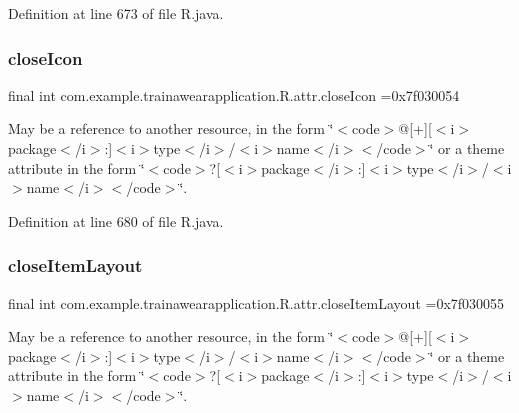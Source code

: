 Definition at line 673 of file R.\+java.

\mbox{\label{classcom_1_1example_1_1trainawearapplication_1_1_r_1_1attr_ac9d9c4e0778b08c2c91ad2f622e4270f}} 
\subsubsection{\texorpdfstring{closeIcon}{closeIcon}}
{\footnotesize\ttfamily final int com.\+example.\+trainawearapplication.\+R.\+attr.\+close\+Icon =0x7f030054\hspace{0.3cm}{\ttfamily [static]}}

May be a reference to another resource, in the form \char`\"{}$<$code$>$@\mbox{[}+\mbox{]}\mbox{[}$<$i$>$package$<$/i$>$\+:\mbox{]}$<$i$>$type$<$/i$>$/$<$i$>$name$<$/i$>$$<$/code$>$\char`\"{} or a theme attribute in the form \char`\"{}$<$code$>$?\mbox{[}$<$i$>$package$<$/i$>$\+:\mbox{]}$<$i$>$type$<$/i$>$/$<$i$>$name$<$/i$>$$<$/code$>$\char`\"{}. 

Definition at line 680 of file R.\+java.

\mbox{\label{classcom_1_1example_1_1trainawearapplication_1_1_r_1_1attr_aab0fe8f33c33e9568d975b0820208345}} 
\subsubsection{\texorpdfstring{closeItemLayout}{closeItemLayout}}
{\footnotesize\ttfamily final int com.\+example.\+trainawearapplication.\+R.\+attr.\+close\+Item\+Layout =0x7f030055\hspace{0.3cm}{\ttfamily [static]}}

May be a reference to another resource, in the form \char`\"{}$<$code$>$@\mbox{[}+\mbox{]}\mbox{[}$<$i$>$package$<$/i$>$\+:\mbox{]}$<$i$>$type$<$/i$>$/$<$i$>$name$<$/i$>$$<$/code$>$\char`\"{} or a theme attribute in the form \char`\"{}$<$code$>$?\mbox{[}$<$i$>$package$<$/i$>$\+:\mbox{]}$<$i$>$type$<$/i$>$/$<$i$>$name$<$/i$>$$<$/code$>$\char`\"{}. 

